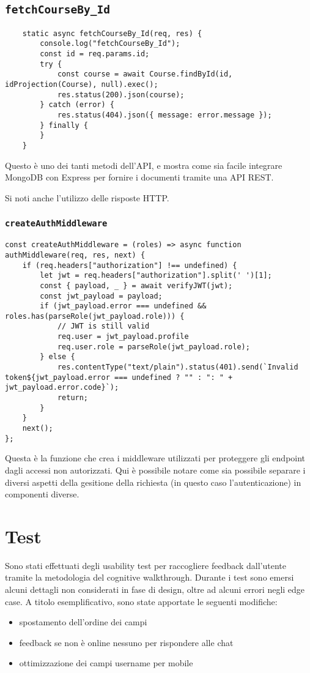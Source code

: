 \documentclass{report}
\begin{document}
\subsection{\texttt{fetchCourseBy\_Id}}
\begin{verbatim}
    static async fetchCourseBy_Id(req, res) {
        console.log("fetchCourseBy_Id");
        const id = req.params.id;
        try {
            const course = await Course.findById(id, idProjection(Course), null).exec();
            res.status(200).json(course);
        } catch (error) {
            res.status(404).json({ message: error.message });
        } finally {
        }
    }
\end{verbatim}
\par Questo è uno dei tanti metodi dell'API, e mostra come sia facile integrare MongoDB con Express per fornire i documenti tramite una API REST.
\par Si noti anche l'utilizzo delle risposte HTTP.
\subsubsection{\texttt{createAuthMiddleware}}
\begin{verbatim}
const createAuthMiddleware = (roles) => async function authMiddleware(req, res, next) {
    if (req.headers["authorization"] !== undefined) {
        let jwt = req.headers["authorization"].split(' ')[1];
        const { payload, _ } = await verifyJWT(jwt);
        const jwt_payload = payload;
        if (jwt_payload.error === undefined && roles.has(parseRole(jwt_payload.role))) {
            // JWT is still valid
            req.user = jwt_payload.profile
            req.user.role = parseRole(jwt_payload.role);
        } else {
            res.contentType("text/plain").status(401).send(`Invalid token${jwt_payload.error === undefined ? "" : ": " + jwt_payload.error.code}`);
            return;
        }
    }
    next();
};
\end{verbatim}
\par Questa è la funzione che crea i middleware utilizzati per proteggere gli endpoint dagli accessi non autorizzati. Qui è possibile notare come sia possibile separare i diversi aspetti della gesitione della richiesta (in questo caso l'autenticazione) in componenti diverse.
\section{Test}
\par Sono stati effettuati degli usability test per raccogliere feedback dall'utente tramite la metodologia del cognitive walkthrough. Durante i test sono emersi alcuni dettagli non considerati in fase di design, oltre ad alcuni errori negli edge case. A titolo esemplificativo, sono state apportate le seguenti modifiche:
\begin{itemize}
    \item spostamento dell'ordine dei campi
    \item feedback se non è online nessuno per rispondere alle chat
    \item ottimizzazione dei campi username per mobile
\end{itemize}
\end{document}

